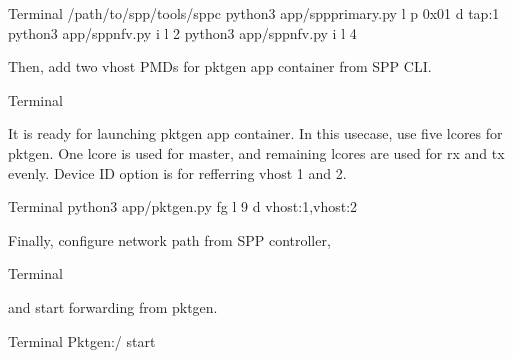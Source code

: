 \documentclass[a4paper,11pt,openany,oneside,english]{sphinxmanual}
\begin{document}
\begin{sphinxVerbatim}[commandchars=\\\{\},formatcom=\footnotesize]
 Terminal 
  /path/to/spp/tools/sppc
 python3 app/spp\PYGZhy{}primary.py \PYGZhy{}l  \PYGZhy{}p 0x01 \PYGZhy{}d tap:1
 python3 app/spp\PYGZhy{}nfv.py \PYGZhy{}i  \PYGZhy{}l \PYGZhy{}2
 python3 app/spp\PYGZhy{}nfv.py \PYGZhy{}i  \PYGZhy{}l \PYGZhy{}4
\end{sphinxVerbatim}

Then, add two vhost PMDs for pktgen app container from SPP CLI.

\begin{sphinxVerbatim}[commandchars=\\\{\},formatcom=\footnotesize]
 Terminal 
\end{sphinxVerbatim}

It is ready for launching pktgen app container. In this usecase,
use five lcores for pktgen. One lcore is used for master, and remaining
lcores are used for rx and tx evenly.
Device ID option  is for refferring vhost 1 and 2.

\begin{sphinxVerbatim}[commandchars=\\\{\},formatcom=\footnotesize]
 Terminal 
 python3 app/pktgen.py \PYGZhy{}fg \PYGZhy{}l \PYGZhy{}9 \PYGZhy{}d vhost:1,vhost:2
\end{sphinxVerbatim}

Finally, configure network path from SPP controller,

\begin{sphinxVerbatim}[commandchars=\\\{\},formatcom=\footnotesize]
 Terminal 
\end{sphinxVerbatim}

and start forwarding from pktgen.

\begin{sphinxVerbatim}[commandchars=\\\{\},formatcom=\footnotesize]
 Terminal 
 Pktgen:/\PYGZgt{} start 
\end{sphinxVerbatim}
\end{document}
